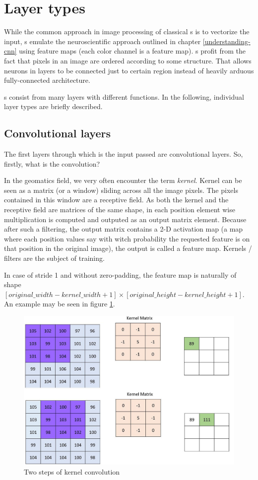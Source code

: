 \section{Layer types}
\label{layers}

While the common approach in image processing of classical s is to vectorize the input, s emulate the neuroscientific approach outlined in chapter \ref{understanding-cnn} using feature maps (each color channel is a feature map). s profit from the fact that pixels in an image are ordered according to some structure. That allows neurons in layers to be connected just to certain region instead of heavily arduous fully-connected architecture. 

s consist from many layers with different functions. In the following, individual layer types are briefly described. 

\subsection{Convolutional layers}
\label{conv-layers}

The first layers through which is the input passed are convolutional layers. So, firstly, what is the convolution? 

In the geomatics field, we very often encounter the term \textit{kernel}. Kernel can be seen as a matrix (or a window) sliding across all the image pixels. The pixels contained in this window are a receptive field. As both the kernel and the receptive field are matrices of the same shape, in each position element wise multiplication is computed and outputed as an output matrix element. Because after such a filtering, the output matrix contains a 2-D activation map (a map where each position values say with witch probability the requested feature is on that position in the original image), the output is called a feature map. Kernels / filters are the subject of training. 

In case of stride 1 and without zero-padding, the feature map is naturally of shape $[original\_width - kernel\_width + 1] \times [original\_height - kernel\_height + 1]$. An example may be seen in figure \ref{fig:conv}. 

\begin{figure}[H]
   \centering
	\includegraphics[width=.4\linewidth]{./pictures/conv.jpg}
	\caption[Two steps of kernel convolution]{Two steps of kernel convolution}
      \label{fig:conv}
\end{figure}

